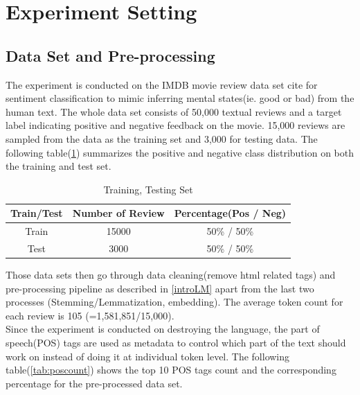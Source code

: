 \documentclass[12pt]{article}
\begin{document}
\section{Experiment Setting} 

\subsection{Data Set and Pre-processing}
The experiment is conducted on the IMDB movie review data set {cite} for sentiment classification to  mimic inferring mental states(ie. good or bad) from the human text. The whole data set consists of 50,000 textual reviews and a target label indicating  positive and negative feedback on the movie. 15,000 reviews are sampled from the data as the training set and 3,000 for testing data. The following table(\ref{tab:dataset}) summarizes the positive and negative class distribution on both the training and test set.
\begin{table}[!h]
    \centering
        \begin{tabular}{||c|c| c||} 
        \hline
 Train/Test & Number of Review & Percentage(Pos / Neg) \\ 
 \hline\hline
 Train  &  15000  & 50\% / 50\% \\ 
 \hline
  Test & 3000  & 50\% / 50\%  \\ 
 \hline
    \end{tabular}
     \caption{Training, Testing Set}
    \label{tab:dataset}
\end{table} 

Those data sets then go through data cleaning(remove html related tags) and pre-processing pipeline as described in \ref{introLM} apart from the last two processes (Stemming/Lemmatization, embedding). The average token count for each review is 105 (=1,581,851/15,000). \\

Since the experiment is conducted on destroying the language, the part of speech(POS) tags are used as metadata to control which part of the text should work on instead of doing it at individual token level. The following table(\ref{tab:poscount}) shows the top 10 POS tags count and the corresponding percentage  for the pre-processed data set.
\end{document}
